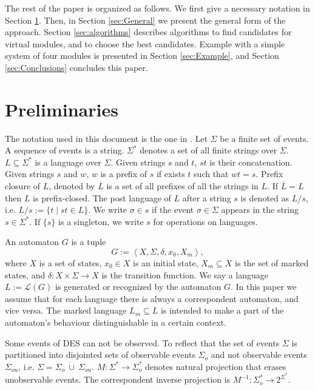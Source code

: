 \documentclass[a4paper, 10pt, conference]{ieeeconf}
\begin{document}
The rest of the paper is organized as follows. We first give a necessary
notation in Section \ref{sec:Preliminaries}. Then, in Section \ref{sec:General}
we present the general form of the approach. Section \ref{sec:algorithms}
describes algorithms to find candidates for virtual modules, and to choose the
best candidates. Example with a simple system of four modules is presented in
Section \ref{sec:Example}, and Section \ref{sec:Conclusions} concludes this
paper.


\section{Preliminaries}
\label{sec:Preliminaries}

The notation used in this document is the one in
\cite{cassandras_introduction_2010}.
Let $\Sigma$ be a finite set of events. A sequence of events is a string.
$\Sigma^*$ denotes a set of all finite strings over $\Sigma$.
$L\subseteq\Sigma^*$ is a language over $\Sigma$. Given strings $s$ and $t$,
$st$ is their concatenation. Given strings $s$ and $w$, $w$ is a prefix of $s$
if exists $t$ such that $wt = s$. Prefix closure of $L$, denoted by
$\overline{L}$ is a set of all prefixes of all the strings in $L$.
If $\overline{L} = L$ then $L$ is prefix-closed. The post language of $L$ after
a string $s$ is denoted as $L/s$, i.e. $L/s := \{t\mid st \in L\}$. We
write $\sigma \in s$ if the event $\sigma \in \Sigma$ appears in the string $s
\in \Sigma^*$. If $\{s\}$ is a singleton, we write $s$ for operations on
languages.

An automaton $G$ is a tuple $$G := \left< X,\Sigma,\delta,x_0, X_m \right>,$$
where $X$ is a set of states, $x_0 \in X$ is an initial state, $X_m \subseteq X$
is the set of marked states, and $\delta: X \times \Sigma \rightarrow X$ is the
transition function.
We say a language $L := \mathcal{L}(G)$ is generated or recognized by the
automaton $G$. In this paper we assume that for each language there is always a
correspondent automaton, and vice versa. The marked language $L_m \subseteq L$
is intended to make a part of the automaton's behaviour distinguishable in a
certain context.

Some events of DES can not be observed. To reflect that the set of events
$\Sigma$ is partitioned into disjointed sets of observable events $\Sigma_o$ and
not observable events $\Sigma_{ou}$, i.e. $\Sigma = \Sigma_o~\dot{\cup}~
\Sigma_{ou}$.
$M: \Sigma^* \rightarrow \Sigma_o^*$ denotes natural projection that
erases unobservable events.
The correspondent inverse projection is $M^{-1}: \Sigma_o^* \rightarrow
2^{\Sigma^*}$.
\end{document}
